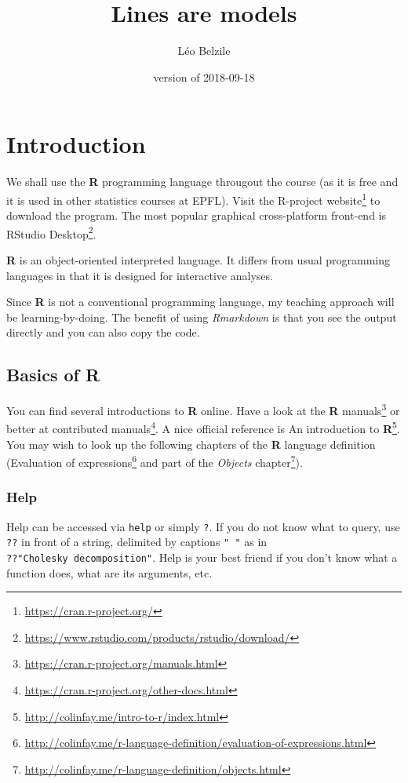 \documentclass[]{book}
\title{Lines are models}
\author{Léo Belzile}
\date{version of 2018-09-18}
\let\rmarkdownfootnote\footnote%
\def\footnote{\protect\rmarkdownfootnote}
\renewcommand{\href}[2]{#2\footnote{\url{#1}}}
\begin{document}
\maketitle

{
\setcounter{tocdepth}{1}
\tableofcontents
}
\chapter{Introduction}\label{introduction}

We shall use the \textbf{R} programming language througout the course
(as it is free and it is used in other statistics courses at EPFL).
Visit \href{https://cran.r-project.org/}{the R-project website} to
download the program. The most popular graphical cross-platform
front-end is
\href{https://www.rstudio.com/products/rstudio/download/}{RStudio
Desktop}.

\textbf{R} is an object-oriented interpreted language. It differs from
usual programming languages in that it is designed for interactive
analyses.

Since \textbf{R} is not a conventional programming language, my teaching
approach will be learning-by-doing. The benefit of using
\emph{Rmarkdown} is that you see the output directly and you can also
copy the code.

\section{\texorpdfstring{Basics of
\textbf{R}}{Basics of R}}\label{basics-of-r}

You can find several introductions to \textbf{R} online. Have a look at
the \href{https://cran.r-project.org/manuals.html}{\textbf{R} manuals}
or better at
\href{https://cran.r-project.org/other-docs.html}{contributed manuals}.
A nice official reference is
\href{http://colinfay.me/intro-to-r/index.html}{An introduction to
\textbf{R}}. You may wish to look up the following chapters of the
\textbf{R} language definition
(\href{http://colinfay.me/r-language-definition/evaluation-of-expressions.html}{Evaluation
of expressions} and part of the
\href{http://colinfay.me/r-language-definition/objects.html}{\emph{Objects}
chapter}).

\subsection{Help}\label{help}

Help can be accessed via \texttt{help} or simply \texttt{?}. If you do
not know what to query, use \texttt{??} in front of a string, delimited
by captions \texttt{"\ "} as in \texttt{??"Cholesky\ decomposition"}.
Help is your best friend if you don't know what a function does, what
are its arguments, etc.
\end{document}
